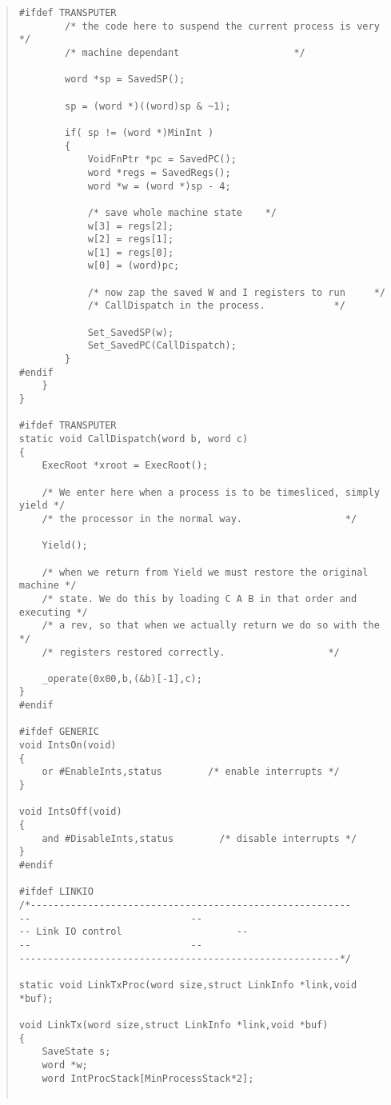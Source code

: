 \begin {quote}
\begin{verbatim}
#ifdef TRANSPUTER
        /* the code here to suspend the current process is very    */
        /* machine dependant                    */

        word *sp = SavedSP();

        sp = (word *)((word)sp & ~1);

        if( sp != (word *)MinInt )
        {
            VoidFnPtr *pc = SavedPC();
            word *regs = SavedRegs();
            word *w = (word *)sp - 4;

            /* save whole machine state    */
            w[3] = regs[2];
            w[2] = regs[1];
            w[1] = regs[0];                
            w[0] = (word)pc;

            /* now zap the saved W and I registers to run     */
            /* CallDispatch in the process.            */

            Set_SavedSP(w);
            Set_SavedPC(CallDispatch);
        }
#endif
    }
}

#ifdef TRANSPUTER
static void CallDispatch(word b, word c)
{
    ExecRoot *xroot = ExecRoot();
    
    /* We enter here when a process is to be timesliced, simply yield */
    /* the processor in the normal way.                  */
    
    Yield();
    
    /* when we return from Yield we must restore the original machine */
    /* state. We do this by loading C A B in that order and executing */
    /* a rev, so that when we actually return we do so with the       */
    /* registers restored correctly.                  */

    _operate(0x00,b,(&b)[-1],c);
}
#endif

#ifdef GENERIC
void IntsOn(void)
{
    or #EnableInts,status        /* enable interrupts */
}

void IntsOff(void)
{
    and #DisableInts,status        /* disable interrupts */
}
#endif

#ifdef LINKIO
/*--------------------------------------------------------
--                            --
-- Link IO control                    --
--                            --
--------------------------------------------------------*/

static void LinkTxProc(word size,struct LinkInfo *link,void *buf);

void LinkTx(word size,struct LinkInfo *link,void *buf)
{
    SaveState s;
    word *w;
    word IntProcStack[MinProcessStack*2];


\end{verbatim}
\end{quote}

